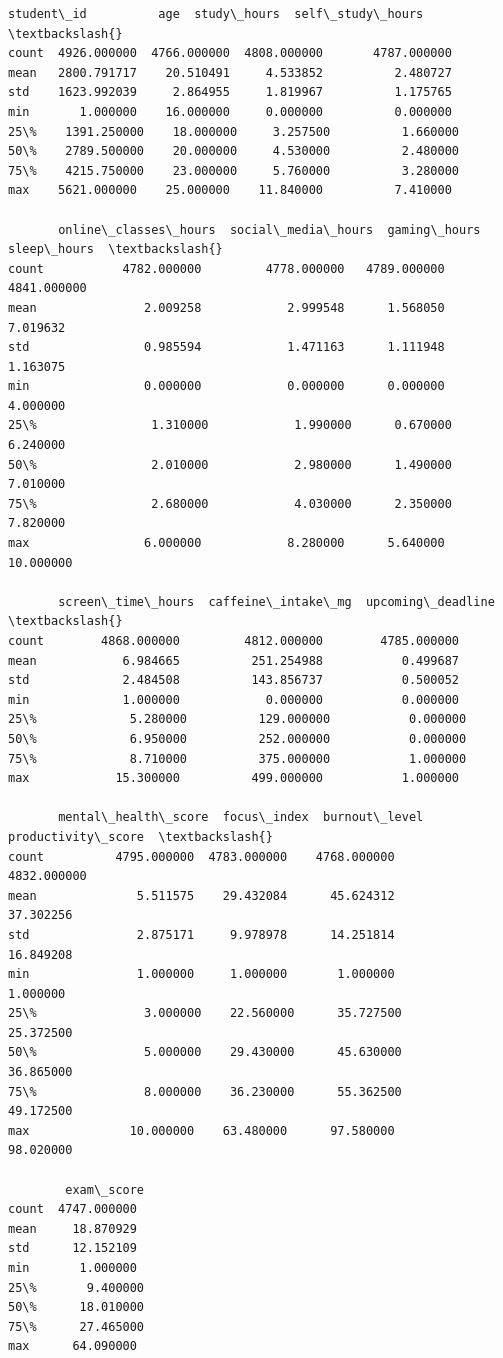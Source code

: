 \documentclass[11pt]{article}
\makeatletter
\newcommand{\boxspacing}{\kern\kvtcb@left@rule\kern\kvtcb@boxsep}
\newcommand{\prompt}[4]{
        {\ttfamily\llap{{\color{#2}[#3]:\hspace{3pt}#4}}\vspace{-\baselineskip}}
    }
\makeatother
\begin{document}
            \begin{tcolorbox}[breakable, size=fbox, boxrule=.5pt, pad at break*=1mm, opacityfill=0]
\prompt{Out}{outcolor}{41}{\boxspacing}
\begin{Verbatim}[commandchars=\\\{\}]
        student\_id          age  study\_hours  self\_study\_hours  \textbackslash{}
count  4926.000000  4766.000000  4808.000000       4787.000000
mean   2800.791717    20.510491     4.533852          2.480727
std    1623.992039     2.864955     1.819967          1.175765
min       1.000000    16.000000     0.000000          0.000000
25\%    1391.250000    18.000000     3.257500          1.660000
50\%    2789.500000    20.000000     4.530000          2.480000
75\%    4215.750000    23.000000     5.760000          3.280000
max    5621.000000    25.000000    11.840000          7.410000

       online\_classes\_hours  social\_media\_hours  gaming\_hours  sleep\_hours  \textbackslash{}
count           4782.000000         4778.000000   4789.000000  4841.000000
mean               2.009258            2.999548      1.568050     7.019632
std                0.985594            1.471163      1.111948     1.163075
min                0.000000            0.000000      0.000000     4.000000
25\%                1.310000            1.990000      0.670000     6.240000
50\%                2.010000            2.980000      1.490000     7.010000
75\%                2.680000            4.030000      2.350000     7.820000
max                6.000000            8.280000      5.640000    10.000000

       screen\_time\_hours  caffeine\_intake\_mg  upcoming\_deadline  \textbackslash{}
count        4868.000000         4812.000000        4785.000000
mean            6.984665          251.254988           0.499687
std             2.484508          143.856737           0.500052
min             1.000000            0.000000           0.000000
25\%             5.280000          129.000000           0.000000
50\%             6.950000          252.000000           0.000000
75\%             8.710000          375.000000           1.000000
max            15.300000          499.000000           1.000000

       mental\_health\_score  focus\_index  burnout\_level  productivity\_score  \textbackslash{}
count          4795.000000  4783.000000    4768.000000         4832.000000
mean              5.511575    29.432084      45.624312           37.302256
std               2.875171     9.978978      14.251814           16.849208
min               1.000000     1.000000       1.000000            1.000000
25\%               3.000000    22.560000      35.727500           25.372500
50\%               5.000000    29.430000      45.630000           36.865000
75\%               8.000000    36.230000      55.362500           49.172500
max              10.000000    63.480000      97.580000           98.020000

        exam\_score
count  4747.000000
mean     18.870929
std      12.152109
min       1.000000
25\%       9.400000
50\%      18.010000
75\%      27.465000
max      64.090000
\end{Verbatim}
\end{tcolorbox}
        
\end{document}
